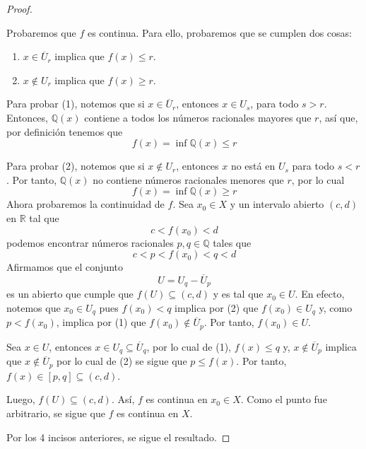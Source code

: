 \documentclass[12pt]{report}
\theoremstyle{largebreak}
\newcommand{\Cls}[1]{\ensuremath{\overline{#1}}}
\begin{document}
\begin{proof}
\begin{enumerate}
            Probaremos que $f$ es continua. Para ello, probaremos que se cumplen dos cosas:
            \begin{enumerate}
                \item $x\in\Cls{U}_r$ implica que $f(x)\leq r$.
                \item $x\notin U_r$ implica que $f(x)\geq r$.
            \end{enumerate}
            Para probar (1), notemos que si $x\in\Cls{U}_r$, entonces $x\in U_s$, para todo $s>r$. Entonces, $\mathbb{Q}(x)$ contiene a todos los números racionales mayores que $r$, así que, por definición tenemos que
            \begin{equation*}
                f(x)=\inf\mathbb{Q}(x)\leq r
            \end{equation*}

            Para probar (2), notemos que si $x\notin U_r$, entonces $x$ no está en $U_s$ para todo $s<r$. Por tanto, $\mathbb{Q}(x)$ no contiene números racionales menores que $r$, por lo cual
            \begin{equation*}
                f(x)=\inf\mathbb{Q}(x)\geq r
            \end{equation*}
            Ahora probaremos la continuidad de $f$. Sea $x_0\in X$ y un intervalo abierto $(c,d)$ en $\mathbb{R}$ tal que
            \begin{equation*}
                c<f(x_0)<d
            \end{equation*}
            podemos encontrar números racionales $p,q\in\mathbb{Q}$ tales que
            \begin{equation*}
                c<p<f(x_0)<q<d
            \end{equation*}
            Afirmamos que el conjunto
            \begin{equation*}
                U=U_q-\Cls{U}_p
            \end{equation*}
            es un abierto que cumple que $f(U)\subseteq(c,d)$ y es tal que $x_0\in U$. En efecto, notemos que $x_0\in U_q$ pues $f(x_0)<q$ implica por (2) que $f(x_0)\in U_q$ y, como $p<f(x_0)$, implica por (1) que $f(x_0)\notin \Cls{U}_p$. Por tanto, $f(x_0)\in U$.

            Sea $x\in U$, entonces $x\in U_q\subseteq \Cls{U}_q$, por lo cual de (1), $f(x)\leq q$ y, $x\notin \Cls{U}_p$ implica que $x\notin\Cls{U}_p$ por lo cual de (2) se sigue que $p\leq f(x)$. Por tanto, $f(x)\in[p,q]\subseteq (c,d)$.

            Luego, $f(U)\subseteq(c,d)$. Así, $f$ es continua en $x_0\in X$. Como el punto fue arbitrario, se sigue que $f$ es continua en $X$.
        \end{enumerate}
        Por los 4 incisos anteriores, se sigue el resultado.


\end{proof}
\end{document}
